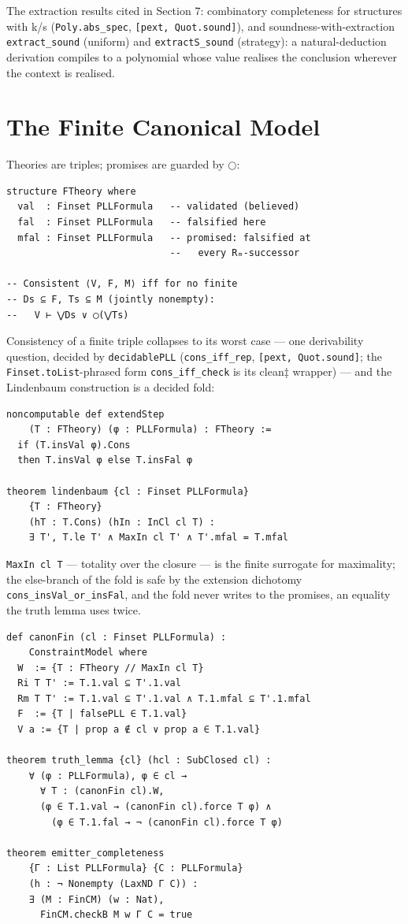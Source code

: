 The extraction results cited in Section 7: combinatory completeness for
structures with k/s (\texttt{Poly.abs\_spec},
\texttt{[pext, Quot.sound]}), and soundness-with-extraction
\texttt{extract\_sound} (uniform) and \texttt{extractS\_sound}
(strategy): a natural-deduction derivation compiles to a polynomial
whose value realises the conclusion wherever the context is realised.

\section{The Finite Canonical Model}\label{app:canonical}

Theories are triples; promises are guarded by \ensuremath{\bigcirc}:

\begin{lstlisting}
structure FTheory where
  val  : Finset PLLFormula   -- validated (believed)
  fal  : Finset PLLFormula   -- falsified here
  mfal : Finset PLLFormula   -- promised: falsified at
                             --   every Rₘ-successor

-- Consistent ⟨V, F, M⟩ iff for no finite
-- Ds ⊆ F, Ts ⊆ M (jointly nonempty):
--   V ⊢ ⋁Ds ∨ ◯(⋁Ts)
\end{lstlisting}

Consistency of a finite triple collapses to its worst case — one
derivability question, decided by \texttt{decidablePLL}
(\texttt{cons\_iff\_rep}, \texttt{[pext, Quot.sound]}; the
\texttt{Finset.toList}-phrased form \texttt{cons\_iff\_check} is its
clean‡ wrapper) — and the Lindenbaum construction is a decided fold:

\begin{lstlisting}
noncomputable def extendStep
    (T : FTheory) (φ : PLLFormula) : FTheory :=
  if (T.insVal φ).Cons
  then T.insVal φ else T.insFal φ

theorem lindenbaum {cl : Finset PLLFormula}
    {T : FTheory}
    (hT : T.Cons) (hIn : InCl cl T) :
    ∃ T', T.le T' ∧ MaxIn cl T' ∧ T'.mfal = T.mfal
\end{lstlisting}

\noindent \texttt{MaxIn cl T} — totality over the closure — is the
finite surrogate for maximality; the else-branch of the fold is safe by
the extension dichotomy \texttt{cons\_insVal\_or\_insFal}, and the fold
never writes to the promises, an equality the truth lemma uses twice.

\begin{lstlisting}
def canonFin (cl : Finset PLLFormula) :
    ConstraintModel where
  W  := {T : FTheory // MaxIn cl T}
  Ri T T' := T.1.val ⊆ T'.1.val
  Rm T T' := T.1.val ⊆ T'.1.val ∧ T.1.mfal ⊆ T'.1.mfal
  F  := {T | falsePLL ∈ T.1.val}
  V a := {T | prop a ∉ cl ∨ prop a ∈ T.1.val}

theorem truth_lemma {cl} (hcl : SubClosed cl) :
    ∀ (φ : PLLFormula), φ ∈ cl →
      ∀ T : (canonFin cl).W,
      (φ ∈ T.1.val → (canonFin cl).force T φ) ∧
        (φ ∈ T.1.fal → ¬ (canonFin cl).force T φ)

theorem emitter_completeness
    {Γ : List PLLFormula} {C : PLLFormula}
    (h : ¬ Nonempty (LaxND Γ C)) :
    ∃ (M : FinCM) (w : Nat),
      FinCM.checkB M w Γ C = true
\end{lstlisting}

